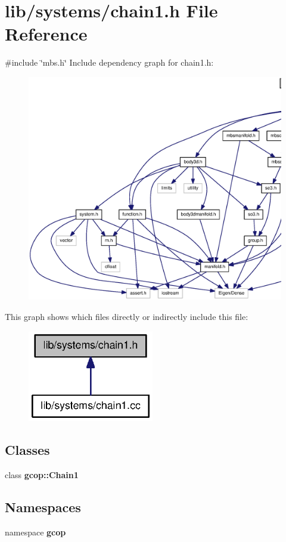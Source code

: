 \section{lib/systems/chain1.h \-File \-Reference}
\label{chain1_8h}
{\ttfamily \#include \char`\"{}mbs.\-h\char`\"{}}\*
\-Include dependency graph for chain1.\-h\-:
\nopagebreak
\begin{figure}[H]
\begin{center}
\leavevmode
\includegraphics[width=350pt]{chain1_8h__incl}
\end{center}
\end{figure}
\-This graph shows which files directly or indirectly include this file\-:
\nopagebreak
\begin{figure}[H]
\begin{center}
\leavevmode
\includegraphics[width=156pt]{chain1_8h__dep__incl}
\end{center}
\end{figure}
\subsection*{\-Classes}
\begin{DoxyCompactItemize}
\item 
class {\bf gcop\-::\-Chain1}
\end{DoxyCompactItemize}
\subsection*{\-Namespaces}
\begin{DoxyCompactItemize}
\item 
namespace {\bf gcop}
\end{DoxyCompactItemize}
